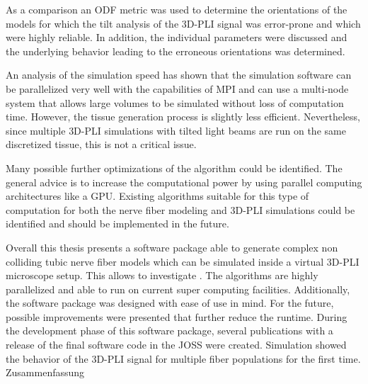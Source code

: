 As a comparison an \ac{ODF} metric was used to determine the orientations of the models for which the tilt analysis of the \ac{3D-PLI} signal was error-prone and which were highly reliable.
In addition, the individual parameters were discussed and the underlying behavior leading to the erroneous orientations was determined.
\par
% 
An analysis of the simulation speed has shown that the simulation software can be parallelized very well with the capabilities of \ac{MPI} and can use a multi-node system that allows large volumes to be simulated without loss of computation time.
However, the tissue generation process is slightly less efficient.
Nevertheless, since multiple \ac{3D-PLI} simulations with tilted light beams are run on the same discretized tissue, this is not a critical issue.
\par
% 
Many possible further optimizations of the algorithm could be identified.
The general advice is to increase the computational power by using parallel computing architectures like a \ac{GPU}.
Existing algorithms suitable for this type of computation for both the nerve fiber modeling and \ac{3D-PLI} simulations could be identified and should be implemented in the future.
\par
% 
Overall this thesis presents a software package able to generate complex non colliding tubic nerve fiber models which can be simulated inside a virtual \ac{3D-PLI} microscope setup.
This allows to investigate \dummy{}.
% 
The algorithms are highly parallelized and able to run on current super computing facilities.
Additionally, the software package was designed with ease of use in mind.
% 
For the future, possible improvements were presented that further reduce the runtime.
% 
During the development phase of this software package, several publications with a release of the final software code in the \ac{JOSS} were created.
% 
Simulation showed the behavior of the \ac{3D-PLI} signal for multiple fiber populations for the first time.
% 
%
\vspace*{20mm}
%
{Zusammenfassung}
\label{sec:abstract-ger}
%
